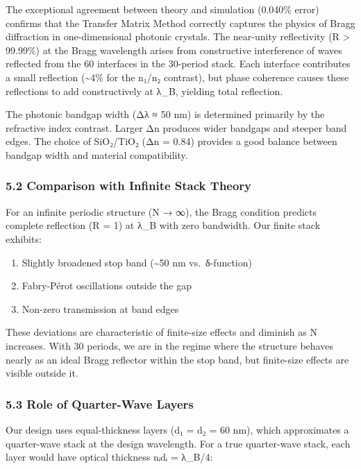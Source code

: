\documentclass[
]{article}
\providecommand{\tightlist}{%
  \setlength{\itemsep}{0pt}\setlength{\parskip}{0pt}}
\begin{document}
The exceptional agreement between theory and simulation (0.040\% error)
confirms that the Transfer Matrix Method correctly captures the physics
of Bragg diffraction in one-dimensional photonic crystals. The
near-unity reflectivity (R \textgreater{} 99.99\%) at the Bragg
wavelength arises from constructive interference of waves reflected from
the 60 interfaces in the 30-period stack. Each interface contributes a
small reflection (\textasciitilde4\% for the n₁/n₂ contrast), but phase
coherence causes these reflections to add constructively at λ\_B,
yielding total reflection.

The photonic bandgap width (Δλ ≈ 50 nm) is determined primarily by the
refractive index contrast. Larger Δn produces wider bandgaps and steeper
band edges. The choice of SiO₂/TiO₂ (Δn = 0.84) provides a good balance
between bandgap width and material compatibility.

\subsubsection{5.2 Comparison with Infinite Stack
Theory}\label{comparison-with-infinite-stack-theory}

For an infinite periodic structure (N → ∞), the Bragg condition predicts
complete reflection (R = 1) at λ\_B with zero bandwidth. Our finite
stack exhibits:

\begin{enumerate}
\def\labelenumi{\arabic{enumi}.}
\tightlist
\item
  Slightly broadened stop band (\textasciitilde50 nm vs.~δ-function)
\item
  Fabry-Pérot oscillations outside the gap
\item
  Non-zero transmission at band edges
\end{enumerate}

These deviations are characteristic of finite-size effects and diminish
as N increases. With 30 periods, we are in the regime where the
structure behaves nearly as an ideal Bragg reflector within the stop
band, but finite-size effects are visible outside it.

\subsubsection{5.3 Role of Quarter-Wave
Layers}\label{role-of-quarter-wave-layers}

Our design uses equal-thickness layers (d₁ = d₂ = 60 nm), which
approximates a quarter-wave stack at the design wavelength. For a true
quarter-wave stack, each layer would have optical thickness nᵢdᵢ =
λ\_B/4:
\end{document}
